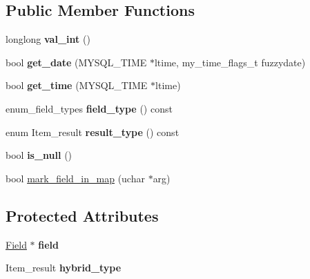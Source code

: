 \subsection*{Public Member Functions}
\begin{DoxyCompactItemize}
\item 
\mbox{\label{classItem__sum__num__field_a4546510b3812fa08cb444f442a83243b}} 
longlong {\bfseries val\+\_\+int} ()
\item 
\mbox{\label{classItem__sum__num__field_a3f9342edb8cb0c94da032baf6ec981a0}} 
bool {\bfseries get\+\_\+date} (M\+Y\+S\+Q\+L\+\_\+\+T\+I\+ME $\ast$ltime, my\+\_\+time\+\_\+flags\+\_\+t fuzzydate)
\item 
\mbox{\label{classItem__sum__num__field_acd1bb20fd0e4e5037d1879e6ff610a46}} 
bool {\bfseries get\+\_\+time} (M\+Y\+S\+Q\+L\+\_\+\+T\+I\+ME $\ast$ltime)
\item 
\mbox{\label{classItem__sum__num__field_a14de7c2e65b8a1bd7754f74eb9f1cad1}} 
enum\+\_\+field\+\_\+types {\bfseries field\+\_\+type} () const
\item 
\mbox{\label{classItem__sum__num__field_aa94c6e155e1a1bdb9f165a76e69ef66f}} 
enum Item\+\_\+result {\bfseries result\+\_\+type} () const
\item 
\mbox{\label{classItem__sum__num__field_ac32dbd5d6a0d764950796b8740c9f2cc}} 
bool {\bfseries is\+\_\+null} ()
\item 
bool \mbox{\hyperlink{classItem__sum__num__field_a2c9ebf8dd31a83c22860bcb2c68c8c60}{mark\+\_\+field\+\_\+in\+\_\+map}} (uchar $\ast$arg)
\end{DoxyCompactItemize}
\subsection*{Protected Attributes}
\begin{DoxyCompactItemize}
\item 
\mbox{\label{classItem__sum__num__field_a71af670e3dd13ba4d23b2376fa1aeedb}} 
\mbox{\hyperlink{classField}{Field}} $\ast$ {\bfseries field}
\item 
\mbox{\label{classItem__sum__num__field_a20f04a734edd5ecc0e633e5212e4761d}} 
Item\+\_\+result {\bfseries hybrid\+\_\+type}
\end{DoxyCompactItemize}
